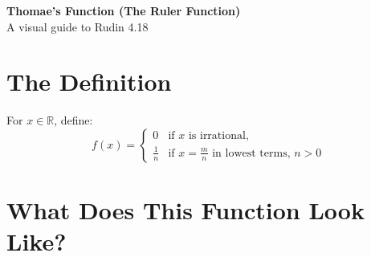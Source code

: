 \documentclass[12pt]{article}
\newcommand{\R}{\mathbb{R}}
\begin{document}
\begin{center}
    \textbf{\Large Thomae's Function (The Ruler Function)}\\[0.5em]
    \large A visual guide to Rudin 4.18
\end{center}

\section{The Definition}

For $x \in \R$, define:
\[
f(x) = \begin{cases}
0 & \text{if } x \text{ is irrational,}\\[0.5em]
\displaystyle\frac{1}{n} & \text{if } x = \displaystyle\frac{m}{n} \text{ in lowest terms, } n > 0
\end{cases}
\]

\section{What Does This Function Look Like?}
\end{document}
